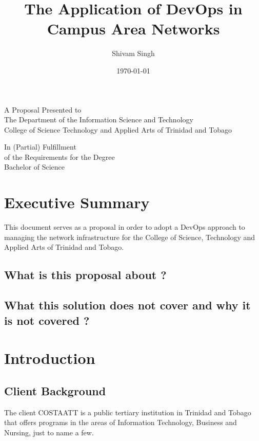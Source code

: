 \documentclass[12pt, letterpaper]{article}
\begin{document}
\title{The Application of DevOps in Campus Area Networks}
\author{Shivam Singh}
\date{\today}
\maketitle


\begin{center}

A Proposal Presented to\\ 
The Department of the Information Science and Technology\\
College of Science Technology and Applied Arts of Trinidad and Tobago 

\vspace{1cm}

In (Partial) Fulfillment\\
of the Requirements for the Degree\\
Bachelor of Science

\end{center}

\newpage
\tableofcontents

\newpage

\section{Executive Summary}

This document serves as a proposal in order to adopt a DevOps approach to managing the network infrastructure for the College of Science, Technology and Applied Arts of Trinidad and Tobago.

	\subsection{What is this proposal about ?}
	\subsection{What this solution does not cover and why it is not covered ?}
	
	
\newpage
\section{Introduction}

	\subsection{Client Background}
The client COSTAATT is a public tertiary institution in Trinidad and Tobago that offers programs in the areas of Information Technology, Business and Nursing, just to name a few.
	
\end{document}
